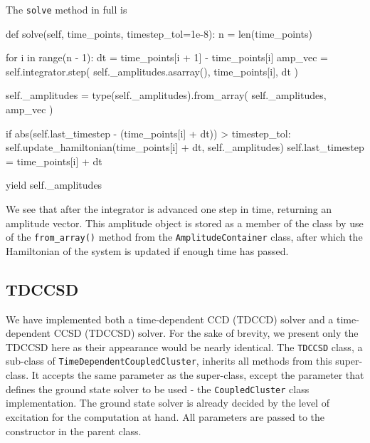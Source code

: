     The \lstinline{solve} method in full is
    \begin{python}
    def solve(self, time_points, timestep_tol=1e-8):
        n = len(time_points)

        for i in range(n - 1):
            dt = time_points[i + 1] - time_points[i]
            amp_vec = self.integrator.step(
                self._amplitudes.asarray(), time_points[i], dt
            )

            self._amplitudes = type(self._amplitudes).from_array(
                self._amplitudes, amp_vec
            )

            if abs(self.last_timestep - (time_points[i] + dt)) > timestep_tol:
                self.update_hamiltonian(time_points[i] + dt, self._amplitudes)
                self.last_timestep = time_points[i] + dt

            yield self._amplitudes
    \end{python}
    We see that after the integrator is advanced one step in time, returning an amplitude 
    vector. This amplitude object is stored as a member of the class by use of the 
    \lstinline{from_array()} method from the \lstinline{AmplitudeContainer} class,
    after which the  
    Hamiltonian of the system is updated if enough time has passed.

    \subsection{TDCCSD}

    \begin{figure}
    
    \end{figure}

    We have implemented both a time-dependent CCD (TDCCD) solver and a time-dependent CCSD
    (TDCCSD)
    solver. For the sake of brevity, we present only the TDCCSD here as their appearance 
    would be nearly identical. 
    The \lstinline{TDCCSD} class, a sub-class of \lstinline{TimeDependentCoupledCluster},
    inherits all methods from this super-class. It accepts the same parameter as the super-class, except the 
    parameter that defines the ground state solver to be used - the \lstinline{CoupledCluster}
    class implementation. The ground state solver is already decided by the level of 
    excitation for the computation at hand. All parameters are passed to the constructor 
    in the parent class.

